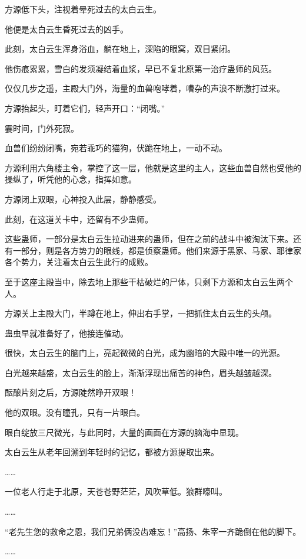 
\begin{this_body}

方源低下头，注视着晕死过去的太白云生。

他便是太白云生昏死过去的凶手。

此刻，太白云生浑身浴血，躺在地上，深陷的眼窝，双目紧闭。

他伤痕累累，雪白的发须凝结着血浆，早已不复北原第一治疗蛊师的风范。

仅仅几步之遥，主殿大门外，海量的血兽咆哮着，嘈杂的声浪不断激打过来。

方源抬起头，盯着它们，轻声开口：“闭嘴。”

霎时间，门外死寂。

血兽们纷纷闭嘴，宛若乖巧的猫狗，伏跪在地上，一动不动。

方源利用六角楼主令，掌控了这一层，他就是这里的主人，这些血兽自然也受他的操纵了，听凭他的心念，指挥如意。

方源闭上双眼，心神投入此层，静静感受。

此刻，在这道关卡中，还留有不少蛊师。

这些蛊师，一部分是太白云生拉动进来的蛊师，但在之前的战斗中被淘汰下来。还有一部分，则是各方势力的眼线，都是侦察蛊师。他们来源于黑家、马家、耶律家各个势力，关注着太白云生此行的成败。

至于这座主殿当中，除去地上那些干枯破烂的尸体，只剩下方源和太白云生两个人。

方源关上主殿大门，半蹲在地上，伸出右手掌，一把抓住太白云生的头颅。

蛊虫早就准备好了，他接连催动。

很快，太白云生的脑门上，亮起微微的白光，成为幽暗的大殿中唯一的光源。

白光越来越盛，太白云生的脸上，渐渐浮现出痛苦的神色，眉头越皱越深。

酝酿片刻之后，方源陡然睁开双眼！

他的双眼。没有瞳孔，只有一片眼白。

眼白绽放三尺微光，与此同时，大量的画面在方源的脑海中显现。

太白云生从老年回溯到年轻时的记忆，都被方源提取出来。

……

一位老人行走于北原，天苍苍野茫茫，风吹草低。狼群嚎叫。

……

“老先生您的救命之恩，我们兄弟俩没齿难忘！”高扬、朱宰一齐跪倒在他的脚下。

……


\end{this_body}
